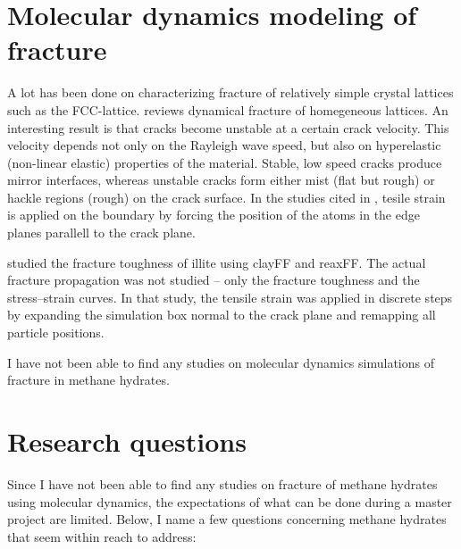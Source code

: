 \section{Molecular dynamics modeling of fracture}
A lot has been done on characterizing fracture of relatively simple crystal lattices such as the FCC-lattice. \citet[ch. 6]{doi:10.1142/9789812773326_0001} reviews dynamical fracture of homegeneous lattices. An interesting result is that cracks become unstable at a certain crack velocity. This velocity depends not only on the Rayleigh wave speed, but also on hyperelastic (non-linear elastic) properties of the material. Stable, low speed cracks produce mirror interfaces, whereas unstable cracks form either mist (flat but rough) or hackle regions (rough) on the crack surface. In the studies cited in \citet[ch. 6]{doi:10.1142/9789812773326_0001}, tesile strain is applied on the boundary by forcing the position of the atoms in the edge planes parallell to the crack plane. 

\citet{Hantal2014} studied the fracture toughness of illite using clayFF and reaxFF. The actual fracture propagation was not studied -- only the fracture toughness and the stress--strain curves. In that study, the tensile strain was applied in discrete steps by expanding the simulation box normal to the crack plane and remapping all particle positions.

I have not been able to find any studies on molecular dynamics simulations of fracture in methane hydrates.


\section{Research questions}
Since I have not been able to find any studies on fracture of methane hydrates using molecular dynamics, the expectations of what can be done during a master project are limited. Below, I name a few questions concerning methane hydrates that seem within reach to address:


